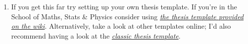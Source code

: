 \documentclass{article}
\begin{document}
\begin{enumerate}[label=\color{purple}\theenumi.]
  \item If you get this far try setting up your own thesis template.
    If you're in the School of Maths, Stats \& Physics consider using 
    \href{https://wiki.mas.ncl.ac.uk/mas/ThesisTemplate?highlight=\%28masthesis\%29}%
    {\emph{the thesis template provided on the wiki}}.
    Alternatively, take a look at other templates online; I'd also recommend having a
    look at the \href{https://ctan.org/pkg/classicthesis?lang=en}%
    {\emph{classic thesis template}}.

\end{enumerate}
\end{document}
